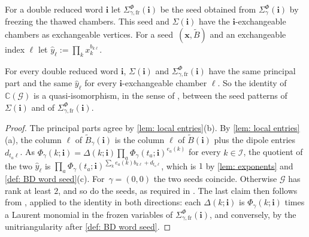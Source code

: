 \documentclass[a4paper]{amsart}
\numberwithin{equation}{section}
\theoremstyle{definition}
\theoremstyle{remark}
\newcommand{\bbC}{\mathbb{C}}
\newcommand{\mcG}{\mathcal{G}}
\newcommand{\mcI}{\mathcal{I}}
\newcommand{\bfi}{\mathbf{i}}
\newcommand{\bx}{\mathbf{x}}
\newcommand{\tB}{\widetilde{B}}
\begin{document}
For a double reduced word $\bfi$ let $\Sigma^\Phi_{\gamma,\mathrm{fr}}(\bfi)$ be the seed obtained from $\Sigma^\Phi_\gamma(\bfi)$ by freezing the thawed chambers.
This seed and $\Sigma(\bfi)$ have the $\bfi$-exchangeable chambers as exchangeable vertices.
For a seed~$(\bx,\tB)$ and an exchangeable index $\ell$ let $\hat y_\ell:=\prod_kx_k^{b_{k\ell}}$.

\begin{corollary}
  \label{cor: Fraser}
  For every double reduced word $\bfi$, $\Sigma(\bfi)$ and $\Sigma^\Phi_{\gamma,\mathrm{fr}}(\bfi)$ have the same principal part and the same $\hat y_\ell$ for every $\bfi$-exchangeable chamber $\ell$.
  So the identity of $\bbC(\mcG)$ is a quasi-isomorphism, in the sense of \cite[Definition~3.5]{Fra16}, between the seed patterns of $\Sigma(\bfi)$ and of $\Sigma^\Phi_{\gamma,\mathrm{fr}}(\bfi)$.
\end{corollary}
\begin{proof}

  The principal parts agree by \cref{lem: local entries}(b).
  By \cref{lem: local entries}(a), the column $\ell$ of $\tB_\gamma(\bfi)$ is the column $\ell$ of $\tB(\bfi)$ plus the dipole entries $d_{t_a\ell}$.
  As $\Phi_\gamma(k;\bfi)=\Delta(k;\bfi)\prod_a\Phi_\gamma(t_a;\bfi)^{e_a(k)}$ for every $k\in\mcI$, the quotient of the two $\hat y_\ell$ is $\prod_a\Phi_\gamma(t_a;\bfi)^{\sum_ke_a(k)b_{k\ell}+d_{t_a\ell}}$, which is $1$ by \cref{lem: exponents} and \cref{def: BD word seed}(c).
  For~$\gamma=(0,0)$ the two seeds coincide.
  Otherwise $\mcG$ has rank at least $2$, and so do the seeds, as required in \cite[Proposition~2.3]{Fra16}.
  The last claim then follows from \cite[Propositions~2.3 and~3.2]{Fra16}, applied to the identity in both directions: each $\Delta(k;\bfi)$ is $\Phi_\gamma(k;\bfi)$ times a Laurent monomial in the frozen variables of $\Sigma^\Phi_{\gamma,\mathrm{fr}}(\bfi)$, and conversely, by the unitriangularity after \cref{def: BD word seed}.
\end{proof}
\end{document}
